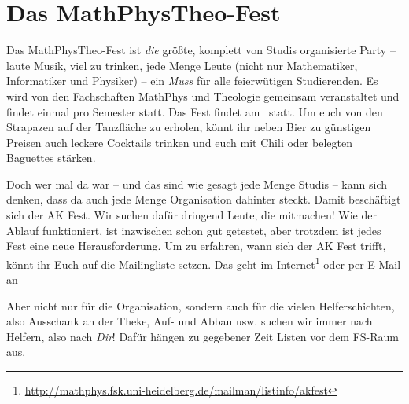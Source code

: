 \section{Das MathPhysTheo-Fest}

Das MathPhysTheo-Fest ist \emph{die} größte, komplett von Studis organisierte Party -- laute Musik, viel zu
trinken, jede Menge Leute (nicht nur Mathematiker, Informatiker und Physiker) -- ein \emph{Muss} für
alle feierwütigen Studierenden.  Es wird von den Fachschaften MathPhys und
Theologie gemeinsam veranstaltet und findet einmal pro Semester statt. Das Fest findet am \mathphystheotermin\ statt. Um euch von den Strapazen auf der Tanzfläche zu erholen, könnt ihr neben Bier zu günstigen Preisen auch leckere Cocktails trinken und euch mit Chili oder belegten Baguettes stärken.

Doch wer mal da war -- und das sind wie gesagt jede Menge Studis -- kann sich denken, dass da auch
jede Menge Organisation dahinter steckt. Damit beschäftigt sich der AK Fest. Wir
suchen dafür dringend Leute, die mitmachen! Wie der Ablauf funktioniert, ist
inzwischen schon gut getestet, aber trotzdem ist jedes Fest eine neue
Herausforderung. Um zu erfahren, wann sich der AK Fest trifft, könnt ihr Euch auf
die Mailingliste setzen. Das geht im Internet\footnote{\url{http://mathphys.fsk.uni-heidelberg.de/mailman/listinfo/akfest}} oder per E-Mail an 

Aber nicht nur für die Organisation, sondern auch für die vielen
Helferschichten, also Ausschank an der Theke, Auf- und Abbau
usw. suchen wir immer nach Helfern, also nach \emph{Dir}! Dafür hängen zu
gegebener Zeit Listen vor dem FS-Raum aus.




